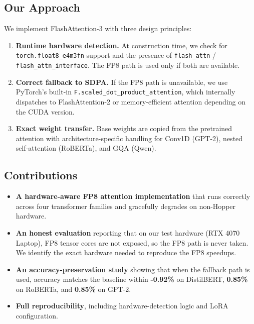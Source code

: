 \subsection{Our Approach}

We implement FlashAttention-3 with three design principles:

\begin{enumerate}
\item \textbf{Runtime hardware detection.} At construction time, we check for
  \texttt{torch.float8\_e4m3fn} support and the presence of \texttt{flash\_attn} /
  \texttt{flash\_attn\_interface}. The FP8 path is used only if both are available.

\item \textbf{Correct fallback to SDPA.} If the FP8 path is unavailable, we use
  PyTorch's built-in \texttt{F.scaled\_dot\_product\_attention}, which internally
  dispatches to FlashAttention-2 or memory-efficient attention depending on
  the CUDA version.

\item \textbf{Exact weight transfer.} Base weights are copied from the pretrained
  attention with architecture-specific handling for Conv1D (GPT-2), nested
  self-attention (RoBERTa), and GQA (Qwen).

\end{enumerate}
\subsection{Contributions}

\begin{itemize}
\item \textbf{A hardware-aware FP8 attention implementation} that runs correctly
  across four transformer families and gracefully degrades on non-Hopper
  hardware.
\item \textbf{An honest evaluation} reporting that on our test hardware (RTX 4070
  Laptop), FP8 tensor cores are not exposed, so the FP8 path is never
  taken. We identify the exact hardware needed to reproduce the FP8
  speedups.
\item \textbf{An accuracy-preservation study} showing that when the fallback path is
  used, accuracy matches the baseline within \textbf{-0.92\%} on DistilBERT,
  \textbf{0.85\%} on RoBERTa, and \textbf{0.85\%} on GPT-2.
\item \textbf{Full reproducibility}, including hardware-detection logic and LoRA
  configuration.

\end{itemize}
